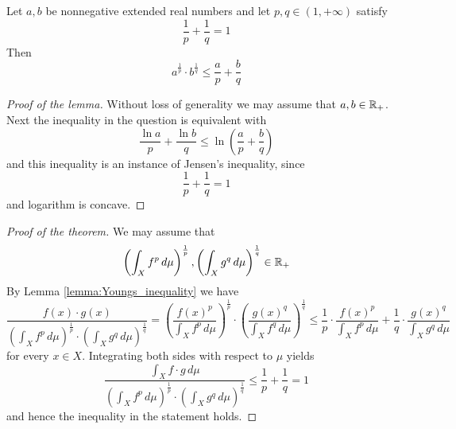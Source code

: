 \begin{lemma}\label{lemma:Youngs_inequality}
    Let $a,b$ be nonnegative extended real numbers and let $p,q\in (1,+\infty)$ satisfy
    $$\frac{1}{p} + \frac{1}{q} = 1$$
    Then
    $$a^{\frac{1}{p}}\cdot b^{\frac{1}{q}} \leq \frac{a}{p} + \frac{b}{q}$$
\end{lemma}
\begin{proof}[Proof of the lemma]
    Without loss of generality we may assume that $a,b\in {\mathbb R}_+$. Next the inequality in the question is equivalent with
    $$\frac{\ln a}{p} + \frac{\ln b}{q} \leq \ln\left(\frac{a}{p} + \frac{b}{q}\right)$$
    and this inequality is an instance of Jensen's inequality, since
    $$\frac{1}{p} + \frac{1}{q} = 1$$
    and logarithm is concave.
\end{proof}

\begin{proof}[Proof of the theorem]
    We may assume that
    $$\left(\int_Xf^p\,d\mu\right)^{\frac{1}{p}}, \left(\int_Xg^q\,d\mu\right)^{\frac{1}{q}} \in {\mathbb R}_+$$
    By Lemma \ref{lemma:Youngs_inequality} we have
    $$\frac{f(x)\cdot g(x)}{\left(\int_X f^p\,d\mu\right)^{\frac{1}{p}}\cdot \left(\int_X g^q\,d\mu\right)^{\frac{1}{q}}} = \left(\frac{f(x)^{p}}{\int_X f^p\,d\mu}\right)^{\frac{1}{p}}\cdot \left(\frac{g(x)^{q}}{\int_X f^q\,d\mu}\right)^{\frac{1}{q}} \leq \frac{1}{p}\cdot \frac{f(x)^p}{\int_X f^p\,d\mu} + \frac{1}{q}\cdot \frac{g(x)^q}{\int_X g^q\,d\mu}$$
    for every $x \in X$. Integrating both sides with respect to $\mu$ yields
    $$\frac{\int_X f\cdot g\,d\mu}{\left(\int_X f^p\,d\mu\right)^{\frac{1}{p}}\cdot \left(\int_X g^q\,d\mu\right)^{\frac{1}{q}}}\leq \frac{1}{p} + \frac{1}{q} = 1$$
    and hence the inequality in the statement holds.
\end{proof}

